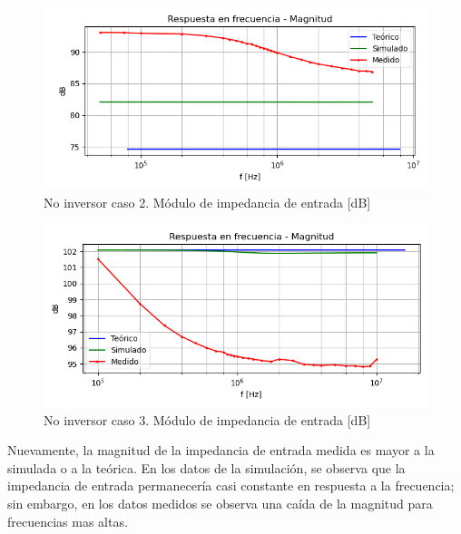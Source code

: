 \begin{figure}[H]
	\centering
		\includegraphics[width=.8\linewidth]{./Imagenes/NoInvCaso2ZinGain.png}  
		\caption{No inversor caso 2. Módulo de impedancia de entrada [dB]}
	\label{fig:circinvcaso1}
\end{figure}

\begin{figure}[H]
	\centering
		\includegraphics[width=.8\linewidth]{./Imagenes/NoInvCaso3ZinGain.png}  
		\caption{No inversor caso 3. Módulo de impedancia de entrada [dB]}
	\label{fig:circinvcaso1}
\end{figure}

Nuevamente, la magnitud de la impedancia de entrada medida es mayor a la simulada o a la teórica. En los datos de la simulación, se observa que la impedancia de entrada permanecería casi constante en respuesta a la frecuencia; sin embargo, en los datos medidos se observa una caída de la magnitud para frecuencias mas altas. 